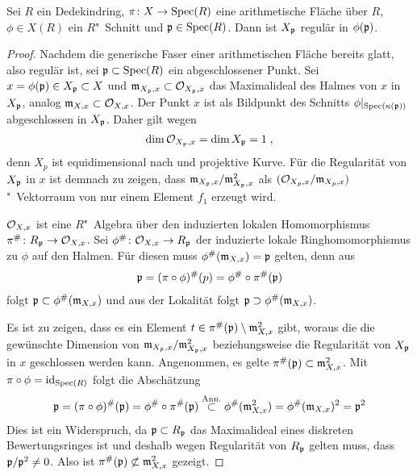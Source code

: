 \begin{Lemma}\label{thm:arithflschnittbilderglatt}
  Sei $R$ ein Dedekindring,
  $\pi\colon X\to\operatorname{Spec}(R)$ eine arithmetische Fläche über $R$,
  ${\phi\in X(R)}$ ein $R$"~Schnitt und $\mathfrak{p}\in\operatorname{Spec}(R)$.
  Dann ist $X_{\mathfrak{p}}$ regulär in $\phi(\mathfrak{p})$.
  \begin{proof}
    Nachdem die generische Faser einer arithmetischen Fläche bereits
    glatt, also regulär ist, sei $\mathfrak{p}\subset\operatorname{Spec}(R)$ ein abgeschlossener
    Punkt.
    Sei $x=\phi(\mathfrak{p})\in X_{\mathfrak{p}}\subset X$ und
    ${\mathfrak{m}_{X_{\mathfrak{p}},x}\subset\mathcal{O}_{X_{\mathfrak{p}},x}}$ das Maximalideal des Halmes von
    $x$ in $X_{\mathfrak{p}}$, analog ${\mathfrak{m}_{X,x}\subset\mathcal{O}_{X,x}}$.
    Der Punkt $x$ ist als Bildpunkt des Schnitts
    $\phi|_{\operatorname{Spec}(\kappa(\mathfrak{p}))}$ abgeschlossen in $X_{\mathfrak{p}}$.
    Daher gilt wegen \cite[Corollary~2.5.24]{liu}
    \begin{gather*}
      \dim\mathcal{O}_{X_{\mathfrak{p}},x}=\dim X_{\mathfrak{p}}=1\;,
    \end{gather*}
    denn $X_p$ ist equidimensional nach
    \cite[Proposition~4.4.16]{liu} und projektive Kurve.
    Für die Regularität von $X_{\mathfrak{p}}$ in $x$ ist demnach zu zeigen,
    dass $\mathfrak{m}_{X_{\mathfrak{p}},x}/\mathfrak{m}_{X_{\mathfrak{p}},x}^2$ als $(\mathcal{O}_{X_p,x}/\mathfrak{m}_{X_p,x})$"~Vektorraum
    von nur einem Element $f_1$ erzeugt wird.
    
    $\mathcal{O}_{X,x}$ ist eine $R$"~Algebra über den induzierten lokalen
    Homomorphismus ${\pi^\#\colon R_{\mathfrak{p}}\to\mathcal{O}_{X,x}}$.
    Sei ${\phi^\#\colon\mathcal{O}_{X,x}\to R_{\mathfrak{p}}}$ der induzierte lokale
    Ringhomomorphismus zu $\phi$ auf den Halmen. Für diesen muss
    ${\phi^\#(\mathfrak{m}_{X,x})=\mathfrak{p}}$ gelten, denn aus
    \begin{gather*}
      {\ensuremath{\mathfrak{p}}=(\pi\circ\phi)^\#(p)=\phi^\#\circ\pi^\#(\ensuremath{\mathfrak{p}})}
    \end{gather*}
    folgt ${\mathfrak{p}\subset\phi^\#(\mathfrak{m}_{X,x})}$ und aus der Lokalität folgt
    ${\mathfrak{p}\supset\phi^\#(\mathfrak{m}_{X,x})}$.
    
    Es ist zu zeigen, dass es ein Element
    ${t\in\pi^\#(\mathfrak{p})\setminus\mathfrak{m}_{X,x}^2}$ gibt, woraus die
    die gewünschte Dimension von ${\mathfrak{m}_{X_{\mathfrak{p}},x}/\mathfrak{m}_{X_{\mathfrak{p}},x}^2}$
    beziehungsweise die Regularität von $X_{\mathfrak{p}}$ in $x$ geschlossen
    werden kann.
    Angenommen, es gelte ${\pi^\#(\mathfrak{p})\subset\mathfrak{m}_{X,x}^2}$.
    Mit ${\pi\circ\phi=\mathrm{id}_{\operatorname{Spec}(R)}}$ folgt die Abschätzung
    \begin{gather*}
      \mathfrak{p} = (\pi\circ\phi)^\#(\mathfrak{p})
      = \phi^\#\circ\pi^\#(\mathfrak{p})
      \overset{\text{Ann.}}{\subset} \phi^\#(\mathfrak{m}_{X,x}^2)
      = \phi^\#(\mathfrak{m}_{X,x})^2
      = \mathfrak{p}^2
    \end{gather*}
    Dies ist ein Widerspruch, da ${\mathfrak{p}\subset R_{\mathfrak{p}}}$ das Maximalideal
    eines diskreten Bewertungsringes ist und deshalb wegen Regularität
    von $R_{\mathfrak{p}}$ gelten muss, dass ${\mathfrak{p}/\mathfrak{p}^2\neq 0}$.
    Also ist ${\pi^\#(\mathfrak{p})\not\subset\mathfrak{m}_{X,x}^2}$ gezeigt.


\end{proof}
\end{Lemma}
